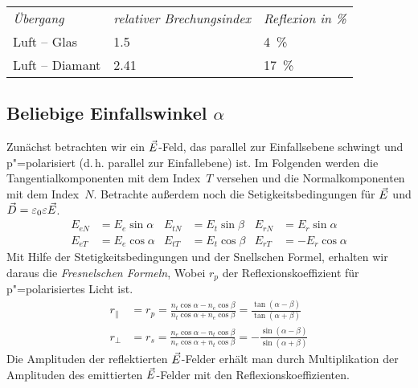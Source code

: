 \Beispiel{}
\begin{center}
  \begin{tabular}{lll}
    \emph{Übergang} & \emph{relativer Brechungsindex} & \emph{Reflexion in \%}\\
    Luft -- Glas & \num{1.5} & \SI{4}{\percent} \\
    Luft -- Diamant & \num{2.41} & \SI{17}{\percent}
  \end{tabular}
\end{center}

\subsection[Beliebige Einfallswinkel]{Beliebige Einfallswinkel $\alpha$}
Zunächst betrachten wir ein $\vec{E}$-Feld, das parallel zur
Einfallsebene schwingt und p"=polarisiert (d.\,h. parallel zur Einfallebene)
ist. Im Folgenden werden die Tangentialkomponenten mit dem Index~$T$
versehen und die Normalkomponenten mit dem Index~$N$. Betrachte außerdem
noch die Setigkeitsbedingungen für $\vec{E}$ und
$\vec{D}=\varepsilon_0\varepsilon\vec{E}$.
\begin{align*}
  E_{eN} &= E_e\sin\alpha
  &E_{tN} &= E_t\sin\beta
  &E_{rN} &= E_r\sin\alpha\\
  E_{eT} &= E_e\cos\alpha
  &E_{tT} &= E_t\cos\beta
  &E_{rT} &= -E_r\cos\alpha
\end{align*}
Mit Hilfe der Stetigkeitsbedingungen und der Snellschen Formel,
erhalten wir daraus die 
\emph{Fresnelschen Formeln}, 
Wobei $r_p$ der Reflexionskoeffizient für p"=polarisiertes Licht ist. 
\begin{align}
  r_{\parallel} 
  &= r_p
    = \frac
    {n_t\cos\alpha - n_e\cos\beta}
    {n_t\cos\alpha + n_e\cos\beta}
    = \frac
    {\tan(\alpha - \beta)}
    {\tan(\alpha + \beta)}\label{FF1}\\
  r_{\bot}
  &=r_s
    = \frac
    {n_e\cos\alpha - n_t\cos\beta}
    {n_e\cos\alpha + n_t\cos\beta}
    = -\frac
    {\sin(\alpha - \beta)}
    {\sin(\alpha + \beta)}\label{FF2}
\end{align}
Die Amplituden der reflektierten $\vec{E}$-Felder erhält man durch
Multiplikation der Amplituden des emittierten $\vec{E}$-Felder mit den
Reflexionskoeffizienten.

